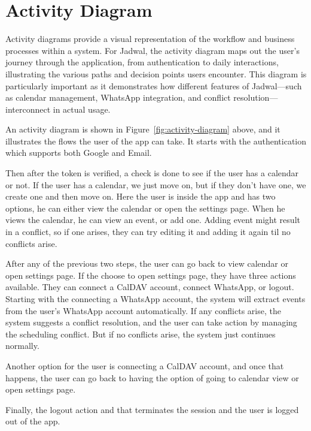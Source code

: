 \section{Activity Diagram}

Activity diagrams provide a visual representation of the workflow and business processes within a system. For Jadwal, the activity diagram maps out the user's journey through the application, from authentication to daily interactions, illustrating the various paths and decision points users encounter. This diagram is particularly important as it demonstrates how different features of Jadwal—such as calendar management, WhatsApp integration, and conflict resolution—interconnect in actual usage.

An activity diagram is shown in Figure~\ref{fig:activity-diagram} above, and it illustrates the flows the user of the app can take. It starts with the authentication which supports both Google and Email.

Then after the token is verified, a check is done to see if the user has a calendar or not. If the user has a calendar, we just move on, but if they don't have one, we create one and then move on. Here the user is inside the app and has two options, he can either view the calendar or open the settings page. When he views the calendar, he can view an event, or add one. Adding event might result in a conflict, so if one arises, they can try editing it and adding it again til no conflicts arise.

After any of the previous two steps, the user can go back to view calendar or open settings page. If the choose to open settings page, they have three actions available. They can connect a CalDAV account, connect WhatsApp, or logout. Starting with the connecting a WhatsApp account, the system will extract events from the user's WhatsApp account automatically. If any conflicts arise, the system suggests a conflict resolution, and the user can take action by managing the scheduling conflict. But if no conflicts arise, the system just continues normally.

Another option for the user is connecting a CalDAV account, and once that happens, the user can go back to having the option of going to calendar view or open settings page.

Finally, the logout action and that terminates the session and the user is logged out of the app.

